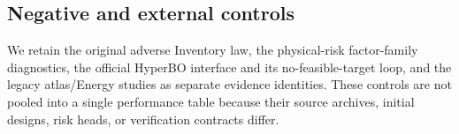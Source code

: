 

\subsection{Negative and external controls}

We retain the original adverse Inventory law, the physical-risk factor-family
diagnostics, the official HyperBO interface and its no-feasible-target loop,
and the legacy atlas/Energy studies as separate evidence identities.  These
controls are not pooled into a single performance table because their source
archives, initial designs, risk heads, or verification contracts differ.
